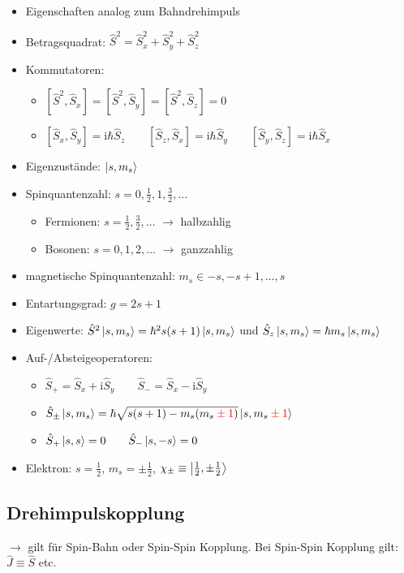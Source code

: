 \documentclass[a4paper,11pt]{article}
\newcommand{\ii}{\mathrm{i}}
\newcommand{\hb}{\hbar}
\begin{document}
\begin{itemize}
\item Eigenschaften analog zum Bahndrehimpuls
\item Betragsquadrat: $\hat S^2 = \hat S_x^2+\hat S_y^2+\hat S_z^2$
\item Kommutatoren:
\begin{itemize}
\item $[\hat S^2,\hat S_x]=[\hat S^2,\hat S_y]=[\hat S^2,\hat S_z]=0$
\item $[\hat S_x,\hat S_y]=\ii\hb\hat S_z \qquad [\hat S_z,\hat S_x]=\ii\hb\hat S_y \qquad [\hat S_y,\hat S_z]=\ii\hb\hat S_x$
\end{itemize}
\item Eigenzustände: $\ket{s,m_s}$
\item Spinquantenzahl: $s=0,\frac12,1,\frac32,\dots$
\begin{itemize}
  \item Fermionen: $s=\frac{1}{2}, \frac{3}{2}, \dots$ $\rightarrow$ halbzahlig
  \item Bosonen: $s = 0,1,2,\dots$ $\rightarrow$ ganzzahlig
\end{itemize}
\item magnetische Spinquantenzahl: $m_s \in {-s,-s+1,\dots,s}$
\item Entartungsgrad: $g=2s+1$
\item Eigenwerte: $\hat S^2\ket{s,m_s}=\hb^2s(s+1)\ket{s,m_s}$ \quad und \quad $\hat S_z\ket{s,m_s}=\hb m_s\ket{s,m_s}$
\item Auf-/Absteigeoperatoren:
\begin{itemize}
\item $\hat S_+=\hat S_x+\ii\hat S_y \qquad \hat S_-=\hat S_x-\ii\hat S_y$
\item $\hat{S}_\pm \ket{s,m_s} = \hb \sqrt{s(s+1) - m_s(m_s \color{red}\pm 1 \color{black})}\ket{s, m_s \color{red} \pm 1}$
\item $\hat S_+\ket{s,s}=0 \qquad \hat S_-\ket{s,-s}=0$
\end{itemize}
\item Elektron: $s=\frac12$, $m_s=\pm\frac12$, $\chi_\pm \equiv \ket{\frac12,\pm\frac12}$
\end{itemize}

\clearpage
\subsection*{Drehimpulskopplung}
\quad $\rightarrow$ gilt für Spin-Bahn oder Spin-Spin Kopplung. Bei Spin-Spin Kopplung gilt: $\hat J \equiv \hat S$ etc. 
\end{document}
